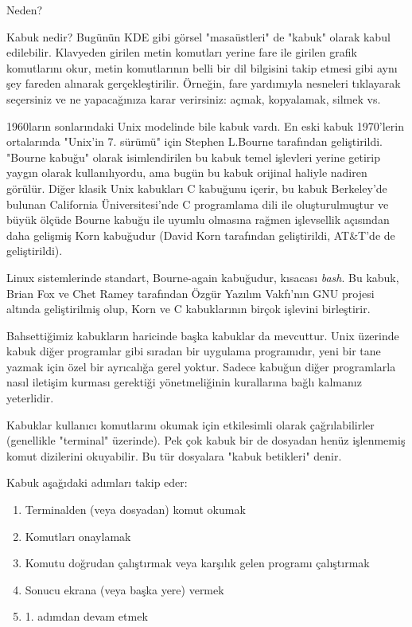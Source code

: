 \begin{section}{Neden?}
\begin{subsection}{Kabuk nedir?}
Bugünün KDE gibi görsel "masaüstleri" de "kabuk" olarak kabul edilebilir. Klavyeden girilen metin komutları yerine fare ile girilen grafik komutlarını okur, metin komutlarının belli bir dil bilgisini takip etmesi gibi aynı şey fareden alınarak gerçekleştirilir. Örneğin, fare yardımıyla nesneleri tıklayarak seçersiniz ve ne yapacağınıza karar verirsiniz: açmak, kopyalamak, silmek vs.

1960ların sonlarındaki Unix modelinde bile kabuk vardı. En eski kabuk 1970'lerin ortalarında "Unix'in 7. sürümü" için Stephen L.Bourne tarafından geliştirildi. "Bourne kabuğu" olarak isimlendirilen bu kabuk temel işlevleri yerine getirip yaygın olarak kullanılıyordu, ama bugün bu kabuk orijinal haliyle nadiren görülür. Diğer klasik Unix kabukları C kabuğunu içerir, bu kabuk Berkeley'de bulunan California Üniversitesi'nde C programlama dili ile oluşturulmuştur ve büyük ölçüde Bourne kabuğu ile uyumlu olmasına rağmen işlevsellik açısından daha gelişmiş Korn kabuğudur (David Korn tarafından geliştirildi, AT\&T'de de geliştirildi).

Linux sistemlerinde standart, Bourne-again kabuğudur, kısacası \emph{bash}. Bu kabuk, Brian Fox ve Chet Ramey tarafından Özgür Yazılım Vakfı'nın GNU projesi altında geliştirilmiş olup, Korn ve C kabuklarının birçok işlevini birleştirir.

Bahsettiğimiz kabukların haricinde başka kabuklar da mevcuttur. Unix üzerinde kabuk diğer programlar gibi sıradan bir uygulama programıdır, yeni bir tane yazmak için özel bir ayrıcalığa gerel yoktur. Sadece kabuğun diğer programlarla nasıl iletişim kurması gerektiği yönetmeliğinin kurallarına bağlı kalmanız yeterlidir.

Kabuklar kullanıcı komutlarını okumak için etkilesimli olarak çağrılabilirler (genellikle "terminal" üzerinde). Pek çok kabuk bir de dosyadan henüz işlenmemiş komut dizilerini okuyabilir. Bu tür dosyalara "kabuk betikleri" denir.

Kabuk aşağıdaki adımları takip eder:
\begin{enumerate}
\item Terminalden (veya dosyadan) komut okumak
\item Komutları onaylamak
\item Komutu doğrudan çalıştırmak veya karşılık gelen programı çalıştırmak
\item Sonucu ekrana (veya başka yere) vermek
\item 1. adımdan devam etmek
\end{enumerate}


\end{subsection}
\end{section}
